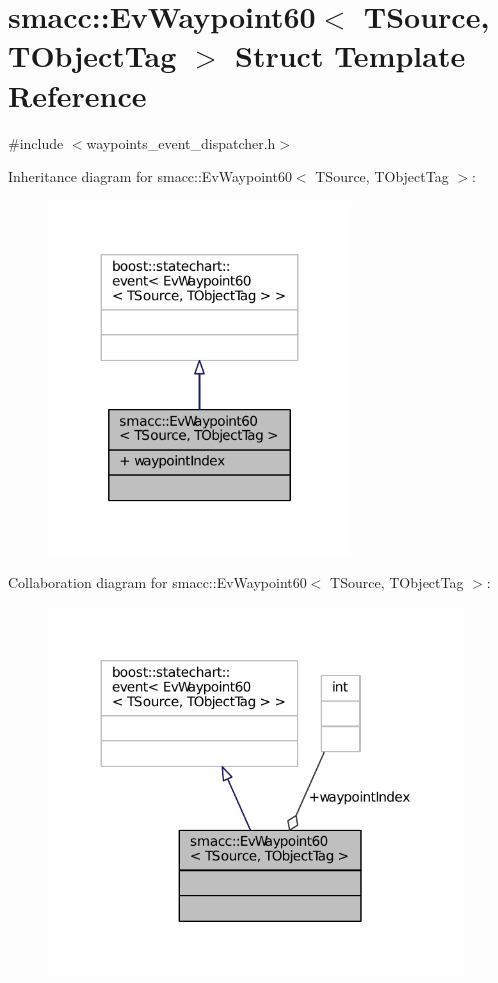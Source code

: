 \hypertarget{structsmacc_1_1EvWaypoint60}{}\section{smacc\+:\+:Ev\+Waypoint60$<$ T\+Source, T\+Object\+Tag $>$ Struct Template Reference}
\label{structsmacc_1_1EvWaypoint60}


{\ttfamily \#include $<$waypoints\+\_\+event\+\_\+dispatcher.\+h$>$}



Inheritance diagram for smacc\+:\+:Ev\+Waypoint60$<$ T\+Source, T\+Object\+Tag $>$\+:
\nopagebreak
\begin{figure}[H]
\begin{center}
\leavevmode
\includegraphics[width=227pt]{structsmacc_1_1EvWaypoint60__inherit__graph}
\end{center}
\end{figure}


Collaboration diagram for smacc\+:\+:Ev\+Waypoint60$<$ T\+Source, T\+Object\+Tag $>$\+:
\nopagebreak
\begin{figure}[H]
\begin{center}
\leavevmode
\includegraphics[width=312pt]{structsmacc_1_1EvWaypoint60__coll__graph}
\end{center}
\end{figure}
